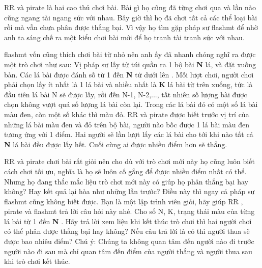 RR   và   pirate   là hai cao thủ chơi bài. Bài gì họ cũng đã từng chơi qua và lần nào cũng ngang tài ngang sức với nhau. Bây giờ thì họ đã chơi tất cả các thể loại bài rồi mà vẫn chưa phân được thắng bại. Vì vậy họ tìm gặp pháp sư   flashmt   để nhờ anh ta sáng chế ra một kiểu chơi bài mới để họ tranh tài tranh sức với nhau.  

flashmt   vốn cũng thích chơi bài từ nhỏ nên anh ấy đã nhanh chóng nghĩ ra được một trò chơi như sau: Vị pháp sư lấy từ túi quần ra 1 bộ bài   \textbf{    N   }   lá, và đặt xuống bàn.       Các lá bài được đánh số từ 1 đến    \textbf{     N    }    từ dưới lên      . Mỗi lượt chơi, người chơi phải chọn lấy ít nhất là 1 lá bài và nhiều nhất là   \textbf{    K   }   lá bài từ trên xuống, tức là đầu tiên lá bài N sẽ được lấy, rồi đến N-1, N-2,..., tất nhiên số lượng bài được chọn không vượt quá số lượng lá bài còn lại. Trong các lá bài đó có một số lá bài màu đen, còn một số khác thì màu đỏ.   RR   và   pirate   được biết trước vị trí của những lá bài màu đen và đỏ trên bộ bài, người nào bốc được 1 lá bài màu đen tương ứng với 1 điểm. Hai người sẽ lần lượt lấy các lá bài cho tới khi nào tất cả   \textbf{    N   }   lá bài đều được lấy hết. Cuối cùng ai được nhiều điểm hơn sẽ thắng.  

RR   và   pirate   chơi bài rất giỏi nên cho dù với trò chơi mới này họ cũng luôn biết cách chơi tối ưu, nghĩa là họ sẽ luôn cố gắng để được nhiều điểm nhất có thể. Nhưng họ đang thắc mắc liệu trò chơi mới này có giúp họ phân thắng bại hay không? Hay kết quả lại hòa như những lần trước? Điều này thì ngay cả pháp sư   flashmt   cũng không biết được. Bạn là một lập trình viên giỏi, hãy giúp   RR   ,   pirate   và   flashmt   trả lời câu hỏi này nhé.
Cho số N, K, trạng thái màu của từng lá bài từ 1 đến   \textbf{    N   }   . Hãy trả lời xem liệu khi kết thúc trò chơi thì hai người chơi có thể phân được thắng bại hay không? Nếu câu trả lời là có thì người       thua      sẽ được bao nhiêu điểm? Chú ý: Chúng ta không quan tâm đến người nào đi trước người nào đi sau mà chỉ quan tâm đến điểm của người thắng và người thua sau khi trò chơi kết thúc.
